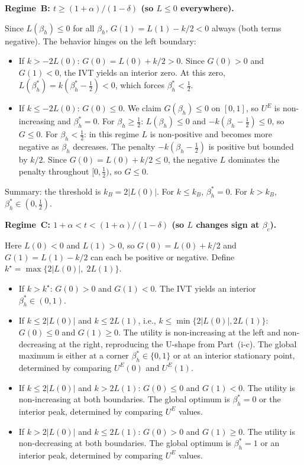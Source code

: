 \documentclass[mnsc,nonblindrev]{informs3_NoOR}
\begin{document}
\medskip\noindent\textbf{Regime~B: $t \geq (1+\alpha)/(1-\delta)$ (so $L \leq 0$ everywhere).}
 
Since $L(\beta_h) \leq 0$ for all $\beta_h$, $G(1) = L(1) - k/2 < 0$ always (both terms negative). The behavior hinges on the left boundary:
\begin{itemize}
\item If $k > -2L(0)$: $G(0) = L(0) + k/2 > 0$. Since $G(0) > 0$ and $G(1) < 0$, the IVT yields an interior zero. At this zero, $L(\beta_h^*) = k(\beta_h^* - \frac{1}{2}) < 0$, which forces $\beta_h^* < \frac{1}{2}$.
 
\item If $k \leq -2L(0)$: $G(0) \leq 0$. We claim $G(\beta_h) \leq 0$ on $[0,1]$, so $U^E$ is non-increasing and $\beta_h^* = 0$. For $\beta_h \geq \frac{1}{2}$: $L(\beta_h) \leq 0$ and $-k(\beta_h - \frac{1}{2}) \leq 0$, so $G \leq 0$. For $\beta_h < \frac{1}{2}$: in this regime $L$ is non-positive and becomes more negative as $\beta_h$ decreases. The penalty $-k(\beta_h - \frac{1}{2})$ is positive but bounded by $k/2$. Since $G(0) = L(0) + k/2 \leq 0$, the negative $L$ dominates the penalty throughout $[0, \frac{1}{2})$, so $G \leq 0$.
\end{itemize}
 
Summary: the threshold is $k_B = 2|L(0)|$. For $k \leq k_B$, $\beta_h^* = 0$. For $k > k_B$, $\beta_h^* \in (0, \frac{1}{2})$.
 
\medskip\noindent\textbf{Regime~C: $1+\alpha < t < (1+\alpha)/(1-\delta)$ (so $L$ changes sign at $\beta_c$).}
 
Here $L(0) < 0$ and $L(1) > 0$, so $G(0) = L(0) + k/2$ and $G(1) = L(1) - k/2$ can each be positive or negative. Define $k^{\star} = \max\{2|L(0)|,\; 2L(1)\}$.
 
\begin{itemize}
\item If $k > k^{\star}$: $G(0) > 0$ and $G(1) < 0$. The IVT yields an interior $\beta_h^* \in (0,1)$.
 
\item If $k \leq 2|L(0)|$ and $k \leq 2L(1)$, i.e., $k \leq \min\{2|L(0)|, 2L(1)\}$: $G(0) \leq 0$ and $G(1) \geq 0$. The utility is non-increasing at the left and non-decreasing at the right, reproducing the U-shape from Part~(i-c). The global maximum is either at a corner $\beta_h^* \in \{0,1\}$ or at an interior stationary point, determined by comparing $U^E(0)$ and $U^E(1)$.
 
\item If $k \leq 2|L(0)|$ and $k > 2L(1)$: $G(0) \leq 0$ and $G(1) < 0$. The utility is non-increasing at both boundaries. The global optimum is $\beta_h^* = 0$ or the interior peak, determined by comparing $U^E$ values.
 
\item If $k > 2|L(0)|$ and $k \leq 2L(1)$: $G(0) > 0$ and $G(1) \geq 0$. The utility is non-decreasing at both boundaries. The global optimum is $\beta_h^* = 1$ or an interior peak, determined by comparing $U^E$ values.
\end{itemize}
 
\end{document}
